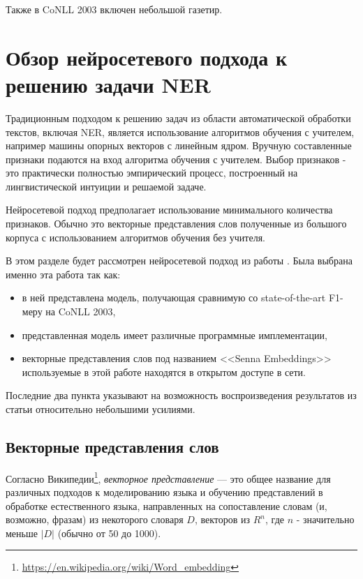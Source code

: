   Также в CoNLL 2003 включен небольшой газетир.

  \section{Обзор нейросетевого подхода к решению задачи NER}  \label{section:nn}

  Традиционным подходом к решению задач из области автоматической обработки текстов,
  включая NER, является использование алгоритмов обучения с учителем, например
  машины опорных векторов с линейным ядром. Вручную составленные признаки подаются на вход
  алгоритма обучения с учителем. Выбор признаков - это практически полностью эмпирический
  процесс, построенный на лингвистической интуиции и решаемой задаче.

  Нейросетевой подход предполагает использование минимального количества признаков.
  Обычно это векторные представления слов полученные из большого корпуса с использованием
  алгоритмов обучения без учителя.

  В этом разделе будет рассмотрен нейросетевой подход из работы
  \citep{collobert2011natural}. Была выбрана именно эта работа так как:
  \begin{itemize}
  \item в ней представлена модель, получающая сравнимую со state-of-the-art F1-меру на CoNLL 2003,
  \item представленная модель имеет различные программные имплементации,
  \item векторные представления слов под названием <<Senna Embeddings>>
    используемые в этой работе находятся в открытом доступе в сети.
  \end{itemize}
  Последние два пункта указывают на возможность воспроизведения результатов из статьи относительно небольшими усилиями.

  \subsection{Векторные представления слов}

  Согласно Википедии\footnote{\url{https://en.wikipedia.org/wiki/Word_embedding}},
  \textit{векторное представление} — это общее название для различных
  подходов к моделированию языка и обучению представлений в обработке естественного языка,
  направленных на сопоставление словам (и, возможно, фразам) из некоторого словаря $D$,
  векторов из $R^n$, где $n$ - значительно меньше $|D|$ (обычно от 50 до 1000).

